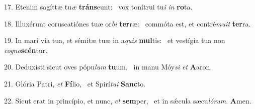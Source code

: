 17. Etenim sagíttæ tu\textit{æ} \textbf{tráns}eunt: \ast\  vox tonítrui tu\textit{i} \textit{in} \textbf{ro}ta.\

18. Illuxérunt coruscatiónes tuæ or\textit{bi} \textbf{ter}ræ: \ast\  commóta est, et contré\textit{mu}\textit{it} \textbf{ter}ra.\

19. In mari via tua, et sémitæ tuæ in a\textit{quis} \textbf{mul}tis: \ast\  et vestígia tua non \textit{co}\textit{gno}\textbf{scén}tur.\

20. Deduxísti sicut oves pópu\textit{lum} \textbf{tu}um, \ast\  in manu Móy\textit{si} \textit{et} \textbf{A}aron.\

21. Glória Patri, \textit{et} \textbf{Fí}lio, \ast\  et Spirí\textit{tu}\textit{i} \textbf{Sanc}to.\

22. Sicut erat in princípio, et nunc, \textit{et} \textbf{sem}per, \ast\  et in sǽcula sæcu\textit{ló}\textit{rum}. \textbf{A}men.\

